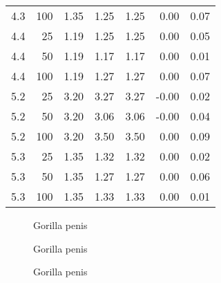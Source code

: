 \begin{table}[htb!]
\begin{tabular}{rrrrrrr}
        4.3           & 100   & 1.35   & 1.25    & 1.25    & 0.00     & 0.07   \\
        4.4           & 25    & 1.19   & 1.25    & 1.25    & 0.00     & 0.05   \\
        4.4           & 50    & 1.19   & 1.17    & 1.17    & 0.00     & 0.01   \\
        4.4           & 100   & 1.19   & 1.27    & 1.27    & 0.00     & 0.07   \\
        5.2           & 25    & 3.20   & 3.27    & 3.27    & -0.00    & 0.02   \\
        5.2           & 50    & 3.20   & 3.06    & 3.06    & -0.00    & 0.04   \\
        5.2           & 100   & 3.20   & 3.50    & 3.50    & 0.00     & 0.09   \\
        5.3           & 25    & 1.35   & 1.32    & 1.32    & 0.00     & 0.02   \\
        5.3           & 50    & 1.35   & 1.27    & 1.27    & 0.00     & 0.06   \\
        5.3           & 100   & 1.35   & 1.33    & 1.33    & 0.00     & 0.01   \\
        \bottomrule
    \end{tabular}
\end{table}



\begin{figure}[htb!]
    
    \caption{Gorilla penis}
    \label{fig:semirandom-cupaal-jajapy-4-2}
\end{figure}

\begin{figure}[htb!]
    
    \caption{Gorilla penis}
    \label{fig:semirandom-cupaal-jajapy-4-3}
\end{figure}

\begin{figure}[htb!]
    
    \caption{Gorilla penis}
    \label{fig:semirandom-cupaal-jajapy-4-4}
\end{figure}

\subsection{}